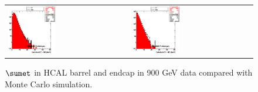 \begin{figure}[h!]
 \centering
 \begin{tabular}{ll}
  \includegraphics[width=0.40\textwidth]{plots_DataVsMC_MB_900GeV/h_caloSumetHB.eps} &
  \includegraphics[width=0.40\textwidth]{plots_DataVsMC_MB_900GeV/h_caloSumetHE.eps} \\
 \end{tabular}
 \caption{$\sumet$ in HCAL barrel and endcap in 900 GeV data compared
   with Monte Carlo simulation.
          \label{fig:DataVsMC_MB_900_5}}
\end{figure}

